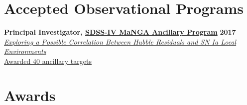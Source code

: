 \documentclass[margin]{res}
\begin{document}
\begin{resume}
\section{Accepted Observational Programs} %





{\bf Principal Investigator, \href{http://www.sdss.org/dr13/manga/}{SDSS-IV MaNGA Ancillary Program}} \hfill \textbf{2017} \\
\href{https://trac.sdss.org/wiki/MANGA/Survey/AncillaryPrograms2017/Rose_SNIa_Environments_and_HR}{\textit{Exploring a Possible Correlation Between Hubble Residuals and SN Ia Local Environments}}\\
\href{http://www.sdss.org/dr14/manga/manga-target-selection/ancillary-targets/}{Awarded 40 ancillary targets}




\section{Awards} 


\end{resume}
\end{document}
